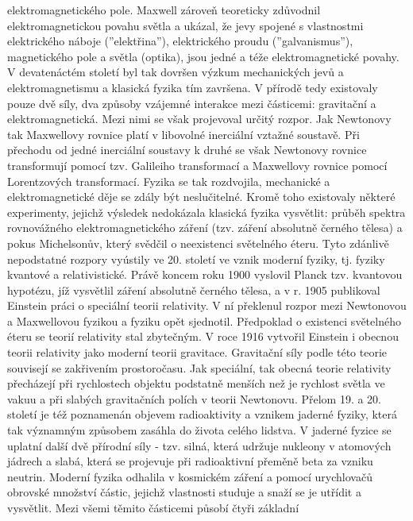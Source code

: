     elektromagnetického pole. Maxwell zároveň teoreticky zdůvodnil elektromagnetickou povahu světla
    a ukázal, že jevy spojené s vlastnostmi elektrického náboje (”elektřina”), elektrického proudu
    (”galvanismus”), magnetického pole a světla (optika), jsou jedné a téže elektromagnetické
    povahy. V devatenáctém století byl tak dovršen výzkum mechanických jevů a elektromagnetismu a
    klasická fyzika tím završena. V přírodě tedy existovaly pouze dvě síly, dva způsoby vzájemné
    interakce mezi částicemi: gravitační a elektromagnetická. Mezi nimi se však projevoval určitý
    rozpor. Jak Newtonovy tak Maxwellovy rovnice platí v libovolné inerciální vztažné soustavě. Při
    přechodu od jedné inerciální soustavy k druhé se však Newtonovy rovnice transformují pomocí tzv.
    Galileiho transformací a Maxwellovy rovnice pomocí Lorentzových transformací. Fyzika se tak
    rozdvojila, mechanické a elektromagnetické děje se zdály být neslučitelné. Kromě toho existovaly
    některé experimenty, jejichž výsledek nedokázala klasická fyzika vysvětlit: průběh spektra
    rovnovážného elektromagnetického záření (tzv. záření absolutně černého tělesa) a pokus
    Michelsonův, který svědčil o neexistenci světelného éteru. Tyto zdánlivě nepodstatné rozpory
    vyústily ve 20. století ve vznik moderní fyziky, tj. fyziky kvantové a relativistické. Právě
    koncem roku 1900 vyslovil Planck tzv. kvantovou hypotézu, jíž vysvětlil záření absolutně černého
    tělesa, a v r. 1905 publikoval Einstein práci o speciální teorii relativity. V ní překlenul
    rozpor mezi Newtonovou a Maxwellovou fyzikou a fyziku opět sjednotil. Předpoklad o existenci
    světelného éteru se teorií relativity stal zbytečným. V roce 1916 vytvořil Einstein i obecnou
    teorii relativity jako moderní teorii gravitace. Gravitační síly podle této teorie souvisejí se
    zakřivením prostoročasu. Jak speciální, tak obecná teorie relativity přecházejí při rychlostech
    objektu podstatně menších než je rychlost světla ve vakuu a při slabých gravitačních polích v
    teorii Newtonovu. Přelom 19. a 20. století je též poznamenán objevem radioaktivity a vznikem
    jaderné fyziky, která tak významným způsobem zasáhla do života celého lidstva. V jaderné fyzice
    se uplatní další dvě přírodní síly - tzv. silná, která udržuje nukleony v atomových jádrech a
    slabá, která se projevuje při radioaktivní přeměně beta za vzniku neutrin. Moderní fyzika
    odhalila v kosmickém záření a pomocí urychlovačů obrovské množství částic, jejichž vlastnosti
    studuje a snaží se je utřídit a vysvětlit. Mezi všemi těmito částicemi působí čtyři základní
